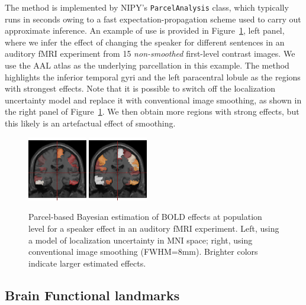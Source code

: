 \documentclass{bioinfo}
\begin{document}
The method is implemented by NIPY's {\tt ParcelAnalysis} class, which
typically runs in seconds owing to a fast expectation-propagation
scheme \citep{minka:techrep:05} used to carry out approximate
inference. An example of use is provided in
Figure~\ref{fig:parcel_group}, left panel, where we infer the effect
of changing the speaker for different sentences in an auditory fMRI
experiment from 15 {\em non-smoothed} first-level contrast images. We
use the AAL atlas \citep{tzourio:ni:02} as the underlying parcellation
in this example. The method highlights the inferior temporal gyri and
the left paracentral lobule as the regions with strongest
effects. Note that it is possible to switch off the localization
uncertainty model and replace it with conventional image smoothing, as
shown in the right panel of Figure~\ref{fig:parcel_group}. We then
obtain more regions with strong effects, but this likely is an
artefactual effect of smoothing.

\begin{figure}
\begin{center}
  \includegraphics[width=0.23\textwidth]{parcel_group_analysis.png}
  \includegraphics[width=0.23\textwidth]{parcel_group_analysis_naive.png}
\end{center}
\caption{Parcel-based Bayesian estimation of BOLD effects at
  population level for a speaker effect in an auditory fMRI
  experiment. Left, using a model of localization uncertainty in MNI
  space; right, using conventional image smoothing
  (FWHM=8mm). Brighter colors indicate larger estimated effects.}
\label{fig:parcel_group}
\end{figure}

\subsection{Brain Functional landmarks}
\end{document}
